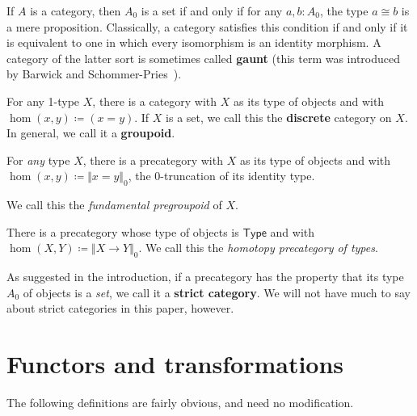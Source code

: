 \documentclass{amsart}
\newcommand{\defeq}{\coloneqq}  %
\newcommand{\type}{\ensuremath{\mathsf{Type}}\xspace}
\newcommand{\trunc}[2]{\Vert #2\Vert_{#1}}
\def\pizero{\trunc0}
\theoremstyle{definition}
\theoremstyle{remark}
\numberwithin{equation}{section}
\begin{document}
\begin{eg}\label{ct:gaunt}
  If $A$ is a category, then $A_0$ is a set if and only if for any $a,b:A_0$, the type $a\cong b$ is a mere proposition.
  Classically, a category satisfies this condition if and only if it is equivalent to one in which every isomorphism is an identity morphism.
  A category of the latter sort is sometimes called \textbf{gaunt} (this term was introduced by Barwick and Schommer-Pries~\cite{bsp12infncats}).
\end{eg}

\begin{eg}\label{ct:discrete}
  For any 1-type $X$, there is a category with $X$ as its type of objects and with $\hom(x,y) \defeq (x=y)$.
  If $X$ is a set, we call this the \textbf{discrete} category on $X$.
  In general, we call it a \textbf{groupoid}.
\end{eg}

\begin{eg}\label{ct:fundgpd}
  For \emph{any} type $X$, there is a precategory with $X$ as its type of objects and with $\hom(x,y) \defeq \pizero{x=y}$, the 0-truncation of its identity type.



  We call this the \emph{fundamental pregroupoid} of $X$.
\end{eg}

\begin{eg}\label{ct:hoprecat}
  There is a precategory whose type of objects is \type and with $\hom(X,Y) \defeq \pizero{X\to Y}$.
  We call this the \emph{homotopy precategory of types}.
\end{eg}


\begin{rmk}\label{defn:strict}
  As suggested in the introduction, if a precategory has the property that its type $A_0$ of objects is a \emph{set}, we call it a \textbf{strict category}.
  We will not have much to say about strict categories in this paper, however.
\end{rmk}


\section{Functors and transformations}
\label{sec:transfors}

The following definitions are fairly obvious, and need no modification.
\end{document}

